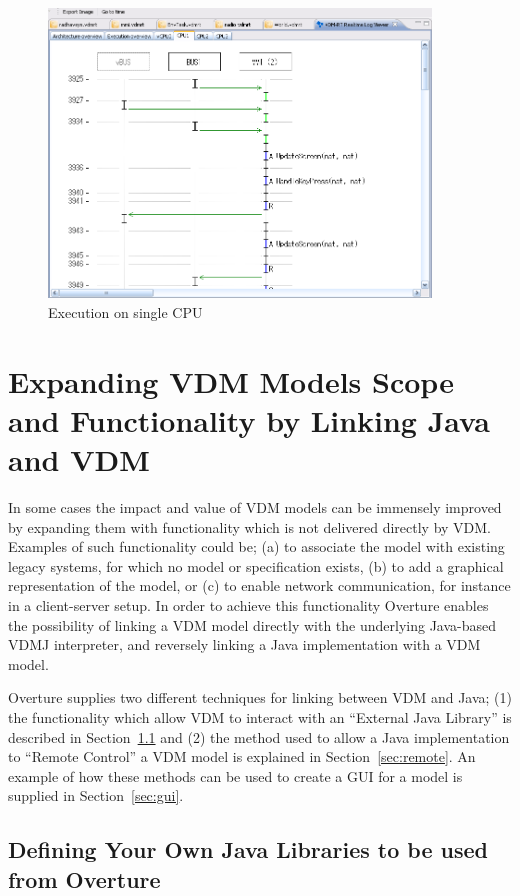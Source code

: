 \documentclass{overturerepchap}
\begin{document}
\begin{figure}[htp]
\begin{center}
  \includegraphics[width=4in]{figures/ExecutionCPU}
  \caption{Execution on single CPU}
  \label{fig:userguide:ExecutionCPU}
\end{center}
\end{figure}

\chapter{Expanding VDM Models Scope and Functionality by Linking Java and VDM} \label{sec:linkToJava}

In some cases the impact and value of VDM models can be immensely improved by expanding them with functionality which is not delivered directly by VDM. Examples of such functionality could be; (a) to associate the model with existing legacy systems, for which no model or specification exists, (b) to add a graphical representation of the model, or (c) to enable network communication, for instance in a client-server setup.  In order to achieve this functionality Overture enables the possibility of linking a VDM model directly with the underlying Java-based VDMJ interpreter, and reversely linking a Java implementation with a VDM model. 

Overture supplies two different techniques for linking between VDM and Java; (1) the functionality which allow VDM to interact with an ``External Java Library'' is described in Section~\ref{sec:javalibs} and (2) the method used to allow a Java implementation to ``Remote Control'' a VDM model is explained in Section~\ref{sec:remote}. An example of how these methods can be used to create a GUI for a model is supplied in Section~\ref{sec:gui}.  

\section{Defining Your Own Java Libraries to be used from Overture}\label{sec:javalibs}
\end{document}
